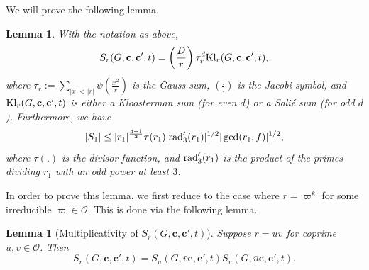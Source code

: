 \documentclass[11pt]{amsart}
\theoremstyle{plain}
\theoremstyle{plain}
\newtheorem{lemma}[theorem]{Lemma}
\renewcommand{\vec}[1]{\mathbf{#1}}
\theoremstyle{remark}
\theoremstyle{definition}
\newcommand{\rad}{\textup{rad}'_3}
\newcommand{\Kl}{\textup{Kl}}
\begin{document}
We will prove the following lemma.
\begin{lemma}\label{lem:S1bound}With the notation as above,
\begin{equation}\label{formulaaw}
S_r(G,\vec{c},\vec{c}',t)=\left(\frac{D}{r}\right)\tau_{r}^d \Kl_r(G,\vec{c},\vec{c}',t),
\end{equation}
where $\tau_{r}:=\sum_{|x|<|r|}\psi\left(\frac{x^2}{r}\right)$ is the Gauss sum, $\left(\frac{.}{.}\right)$ is the Jacobi symbol, and $\Kl_r(G,\vec{c},\vec{c}',t)$ is either a Kloosterman sum (for even $d$) or a Sali\'e sum (for odd $d$). Furthermore, we have
\[|S_1|\leq |r_{1}|^{\frac{d+1}{2}}\tau(r_1)|\rad(r_1)|^{1/2}|\gcd(r_1,f)|^{1/2},\]
where $\tau(.)$ is the divisor function, and $\rad(r_1)$ is the product of the primes dividing $r_1$ with an odd power at least $3$.
\end{lemma}
In order to prove this lemma, we first reduce to the case where $r=\varpi^k$ for some irreducible $\varpi\in\mathcal{O}$. This is done via the following lemma.
\begin{lemma}[Multiplicativity of $S_r(G,\vec{c},\vec{c}',t)$]\label{lem:multiplicative}Suppose $r=uv$ for coprime $u,v\in\mathcal{O}$. Then
\[S_r(G,\vec{c},\vec{c}',t)=S_u(G,\bar{v}\vec{c},\vec{c}',t)S_v(G,\bar{u}\vec{c},\vec{c}',t).\]
\end{lemma}
\end{document}
